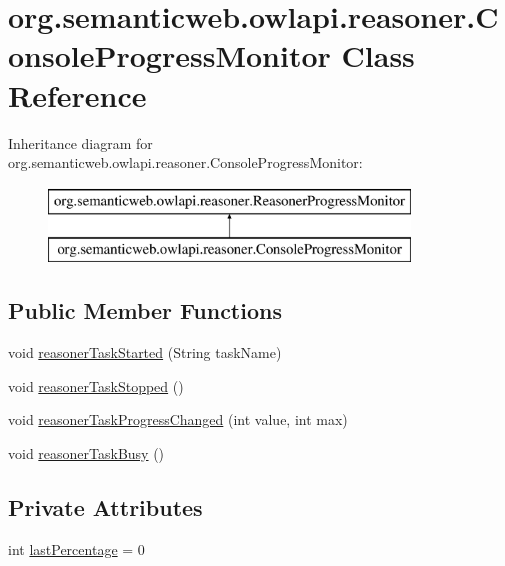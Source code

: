 \hypertarget{classorg_1_1semanticweb_1_1owlapi_1_1reasoner_1_1_console_progress_monitor}{\section{org.\-semanticweb.\-owlapi.\-reasoner.\-Console\-Progress\-Monitor Class Reference}
\label{classorg_1_1semanticweb_1_1owlapi_1_1reasoner_1_1_console_progress_monitor}
}
Inheritance diagram for org.\-semanticweb.\-owlapi.\-reasoner.\-Console\-Progress\-Monitor\-:\begin{figure}[H]
\begin{center}
\leavevmode
\includegraphics[height=2.000000cm]{classorg_1_1semanticweb_1_1owlapi_1_1reasoner_1_1_console_progress_monitor}
\end{center}
\end{figure}
\subsection*{Public Member Functions}
\begin{DoxyCompactItemize}
\item 
void \hyperlink{classorg_1_1semanticweb_1_1owlapi_1_1reasoner_1_1_console_progress_monitor_ad1bef4c4de7ff649baaeeeafce0da633}{reasoner\-Task\-Started} (String task\-Name)
\item 
void \hyperlink{classorg_1_1semanticweb_1_1owlapi_1_1reasoner_1_1_console_progress_monitor_adddb7904b02b93c65be64aadc18812c0}{reasoner\-Task\-Stopped} ()
\item 
void \hyperlink{classorg_1_1semanticweb_1_1owlapi_1_1reasoner_1_1_console_progress_monitor_af0ffeb6c9df9a23c1379868296202321}{reasoner\-Task\-Progress\-Changed} (int value, int max)
\item 
void \hyperlink{classorg_1_1semanticweb_1_1owlapi_1_1reasoner_1_1_console_progress_monitor_a4af568260ba8df2842d9a268ba62792a}{reasoner\-Task\-Busy} ()
\end{DoxyCompactItemize}
\subsection*{Private Attributes}
\begin{DoxyCompactItemize}
\item 
int \hyperlink{classorg_1_1semanticweb_1_1owlapi_1_1reasoner_1_1_console_progress_monitor_a3678e037d9739691da0c207eb1bed1e3}{last\-Percentage} = 0
\end{DoxyCompactItemize}
